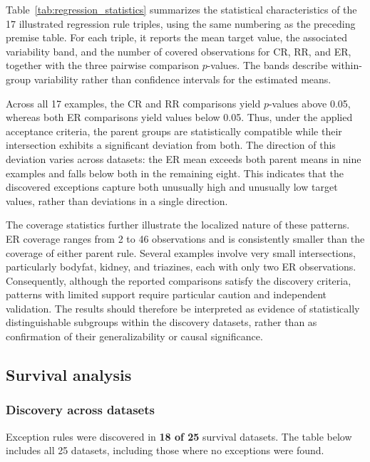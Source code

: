 Table~\ref{tab:regression_statistics} summarizes the statistical characteristics of the 17 illustrated regression rule triples, using the same numbering as the preceding premise table. For each triple, it reports the mean target value, the associated variability band, and the number of covered observations for CR, RR, and ER, together with the three pairwise comparison $p$-values. The bands describe within-group variability rather than confidence intervals for the estimated means.

Across all 17 examples, the CR and RR comparisons yield $p$-values above 0.05, whereas both ER comparisons yield values below 0.05. Thus, under the applied acceptance criteria, the parent groups are statistically compatible while their intersection exhibits a significant deviation from both. The direction of this deviation varies across datasets: the ER mean exceeds both parent means in nine examples and falls below both in the remaining eight. This indicates that the discovered exceptions capture both unusually high and unusually low target values, rather than deviations in a single direction.

The coverage statistics further illustrate the localized nature of these patterns. ER coverage ranges from 2 to 46 observations and is consistently smaller than the coverage of either parent rule. Several examples involve very small intersections, particularly bodyfat, kidney, and triazines, each with only two ER observations. Consequently, although the reported comparisons satisfy the discovery criteria, patterns with limited support require particular caution and independent validation. The results should therefore be interpreted as evidence of statistically distinguishable subgroups within the discovery datasets, rather than as confirmation of their generalizability or causal significance.

\subsection{Survival analysis}
\subsubsection{Discovery across datasets}
\label{survival-analysis}

\label{discovery-across-datasets-2}
Exception rules were discovered in \textbf{18 of 25} survival datasets.
The table below includes all 25 datasets, including those
where no exceptions were found.


